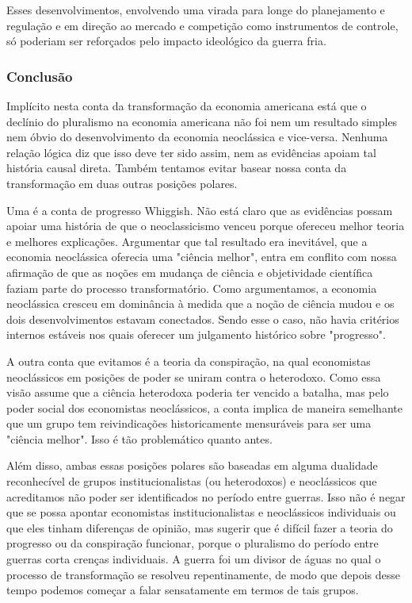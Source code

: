\documentclass[a4paper,12pt]{article}[abntex2]
\begin{document}
Esses desenvolvimentos, envolvendo uma virada para longe do planejamento e regulação e em direção ao mercado e competição como instrumentos de controle, só poderiam ser reforçados pelo impacto ideológico da guerra fria.

\subsubsection{\textbf{Conclusão}}
Implícito nesta conta da transformação da economia americana está que o declínio do pluralismo na economia americana não foi nem um resultado simples nem óbvio do desenvolvimento da economia neoclássica e vice-versa. Nenhuma relação lógica diz que isso deve ter sido assim, nem as evidências apoiam tal história causal direta. Também tentamos evitar basear nossa conta da transformação em duas outras posições polares.

Uma é a conta de progresso Whiggish. Não está claro que as evidências possam apoiar uma história de que o neoclassicismo venceu porque ofereceu melhor teoria e melhores explicações. Argumentar que tal resultado era inevitável, que a economia neoclássica oferecia uma "ciência melhor", entra em conflito com nossa afirmação de que as noções em mudança de ciência e objetividade científica faziam parte do processo transformatório. Como argumentamos, a economia neoclássica cresceu em dominância à medida que a noção de ciência mudou e os dois desenvolvimentos estavam conectados. Sendo esse o caso, não havia critérios internos estáveis nos quais oferecer um julgamento histórico sobre "progresso".

A outra conta que evitamos é a teoria da conspiração, na qual economistas neoclássicos em posições de poder se uniram contra o heterodoxo. Como essa visão assume que a ciência heterodoxa poderia ter vencido a batalha, mas pelo poder social dos economistas neoclássicos, a conta implica de maneira semelhante que um grupo tem reivindicações historicamente mensuráveis para ser uma "ciência melhor". Isso é tão problemático quanto antes.

Além disso, ambas essas posições polares são baseadas em alguma dualidade reconhecível de grupos institucionalistas (ou heterodoxos) e neoclássicos que acreditamos não poder ser identificados no período entre guerras. Isso não é negar que se possa apontar economistas institucionalistas e neoclássicos individuais ou que eles tinham diferenças de opinião, mas sugerir que é difícil fazer a teoria do progresso ou da conspiração funcionar, porque o pluralismo do período entre guerras corta crenças individuais. A guerra foi um divisor de águas no qual o processo de transformação se resolveu repentinamente, de modo que depois desse tempo podemos começar a falar sensatamente em termos de tais grupos.
\end{document}
